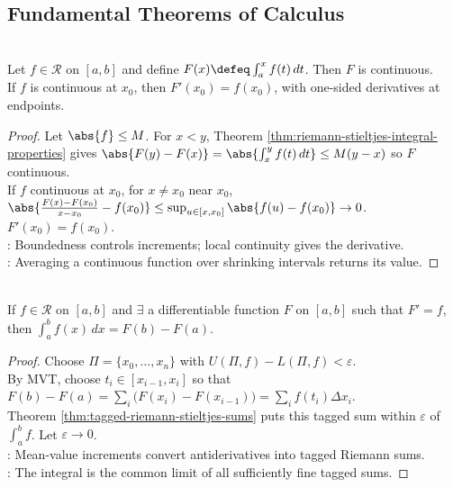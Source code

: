 \subsection{Fundamental Theorems of Calculus}

\begin{theorem} \label{thm:integral-function-continuity-and-derivative} \\
Let $f\in\mathcal{R}$ on $[a,b]$ and define $F(x)\defeq\int_a^x f(t)\,dt$. Then $F$ is continuous.\\
If $f$ is continuous at $x_0$, then $F'(x_0)=f(x_0)$, with one-sided derivatives at endpoints.
\begin{proof}
Let $\abs{f}\leq M$. For $x<y$, Theorem \ref{thm:riemann-stieltjes-integral-properties} gives $\abs{F(y)-F(x)}=\abs{\int_x^y f(t)\,dt}\leq M(y-x)$ so $F$ continuous.\\
If $f$ continuous at $x_0$, for $x\neq x_0$ near $x_0$, $\abs{\frac{F(x)-F(x_0)}{x-x_0}-f(x_0)} \leq \sup_{u \in [x, x_0]}\abs{f(u)-f(x_0)}\to0$. $F'(x_0)=f(x_0)$.\\
: Boundedness controls increments; local continuity gives the derivative.\\
: Averaging a continuous function over shrinking intervals returns its value.
\end{proof}
\end{theorem}

\begin{theorem} \label{thm:fundamental-theorem-calculus-riemann} \\
If $f\in\mathcal{R}$ on $[a,b]$ and $\exists$ a differentiable function $F$ on $[a,b]$ such that $F'=f$, then $\int_a^b f(x)\,dx=F(b)-F(a)$.
\begin{proof}
Choose $\Pi=\{x_0,\ldots,x_n\}$ with $U(\Pi,f)-L(\Pi,f)<\varepsilon$.\\
By MVT, choose $t_i\in[x_{i-1},x_i]$ so that $F(b)-F(a)=\sum\limits_i\bigl(F(x_i)-F(x_{i-1})\bigr)=\sum\limits_i f(t_i)\Delta x_i$.\\
Theorem \ref{thm:tagged-riemann-stieltjes-sums} puts this tagged sum within $\varepsilon$ of $\int_a^b f$. Let $\varepsilon\to0$.\\
: Mean-value increments convert antiderivatives into tagged Riemann sums.\\
: The integral is the common limit of all sufficiently fine tagged sums.
\end{proof}
\end{theorem}


